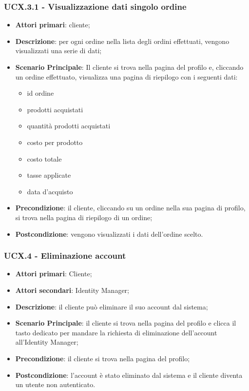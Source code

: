 \subsubsection{UCX.3.1 - Visualizzazione dati singolo ordine}
\begin{itemize}
\item \textbf{Attori primari}: cliente;
\item \textbf{Descrizione}: per ogni ordine nella lista degli ordini effettuati, vengono visualizzati una serie di dati;
\item \textbf{Scenario Principale}: Il cliente si trova nella pagina del profilo e, cliccando un ordine effettuato, visualizza  una pagina di riepilogo con i seguenti dati:
\begin{itemize}
\item id ordine
\item prodotti acquistati
\item quantità prodotti acquistati
\item costo per prodotto
\item costo totale
\item tasse applicate
\item data d'acquisto
\end{itemize}
\item \textbf{Precondizione}: il cliente, cliccando su un ordine nella sua pagina di profilo, si trova nella pagina di riepilogo di un ordine;
\item \textbf{Postcondizione}: vengono visualizzati i dati dell'ordine scelto.
\end{itemize}

\subsubsection{UCX.4 - Eliminazione account}
\begin{itemize}
\item \textbf{Attori primari}: Cliente;
\item \textbf{Attori secondari}: Identity Manager;
\item \textbf{Descrizione}: il cliente può eliminare il suo account dal sistema;
\item \textbf{Scenario Principale}: il cliente si trova nella pagina del profilo e clicca il tasto dedicato per mandare la richiesta di eliminazione dell'account all'Identity Manager;
\item \textbf{Precondizione}: il cliente si trova nella pagina del profilo;
\item \textbf{Postcondizione}: l'account è stato eliminato dal sistema e il cliente diventa un utente non autenticato.
\end{itemize}
